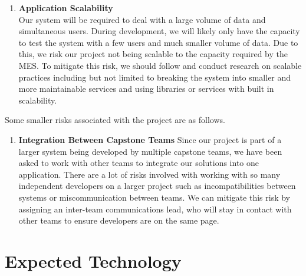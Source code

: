 \documentclass{article}
\begin{document}
\begin{flushleft}
\begin{enumerate}
  \item \textbf{Application Scalability} \\
  Our system will be required to deal with a large volume of data and simultaneous users. During development, we will likely only have the capacity to test the system with a few users and much smaller volume of data. Due to this, we risk our project not being scalable to the capacity required by the MES.
  \newline
  \newline
  To mitigate this risk, we should follow and conduct research on scalable practices including but not limited to breaking the system into smaller and more maintainable services and using libraries or services with built in scalability.
\end{enumerate}

Some smaller risks associated with the project are as follows.

\begin{enumerate}
  \item \textbf{Integration Between Capstone Teams} 
  Since our project is part of a larger system being developed by multiple capstone teams, we have been asked to work with other teams to integrate our solutions into one application. There are a lot of risks involved with working with so many independent developers on a larger project such as incompatibilities between systems or miscommunication between teams.
  \newline
  \newline
  We can mitigate this risk by assigning an inter-team communications lead, who will stay in contact with other teams to ensure developers are on the same page.
  
\end{enumerate}

\end{flushleft}

\section{Expected Technology}
\end{document}
